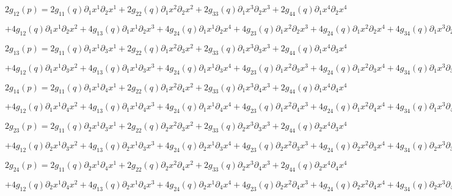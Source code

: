 		$2 g_{12}(p) = 2 g_{11}(q) \partial_1 x^1 \partial_2 x^1 + 2 g_{22}(q) \partial_1 x^2 \partial_2 x^2 + 2 g_{33}(q) \partial_1 x^3 \partial_2 x^3 + 2 g_{44}(q) \partial_1 x^4 \partial_2 x^4$

		$+ 4 g_{12}(q) \partial_1 x^1 \partial_2 x^2 + 4 g_{13}(q) \partial_1 x^1 \partial_2 x^3 + 4 g_{24}(q) \partial_1 x^1 \partial_2 x^4 + 4 g_{23}(q) \partial_1 x^2 \partial_2 x^3 + 4 g_{24}(q) \partial_1 x^2 \partial_2 x^4 + 4 g_{34}(q) \partial_1 x^3 \partial_2 x^4$

		$2 g_{13}(p) = 2 g_{11}(q) \partial_1 x^1 \partial_3 x^1 + 2 g_{22}(q) \partial_1 x^2 \partial_3 x^2 + 2 g_{33}(q) \partial_1 x^3 \partial_3 x^3 + 2 g_{44}(q) \partial_1 x^4 \partial_3 x^4$

		$+ 4 g_{12}(q) \partial_1 x^1 \partial_3 x^2 + 4 g_{13}(q) \partial_1 x^1 \partial_3 x^3 + 4 g_{24}(q) \partial_1 x^1 \partial_3 x^4 + 4 g_{23}(q) \partial_1 x^2 \partial_3 x^3 + 4 g_{24}(q) \partial_1 x^2 \partial_3 x^4 + 4 g_{34}(q) \partial_1 x^3 \partial_3 x^4$

		$2 g_{14}(p) = 2 g_{11}(q) \partial_1 x^1 \partial_4 x^1 + 2 g_{22}(q) \partial_1 x^2 \partial_4 x^2 + 2 g_{33}(q) \partial_1 x^3 \partial_4 x^3 + 2 g_{44}(q) \partial_1 x^4 \partial_4 x^4$

		$+ 4 g_{12}(q) \partial_1 x^1 \partial_4 x^2 + 4 g_{13}(q) \partial_1 x^1 \partial_4 x^3 + 4 g_{24}(q) \partial_1 x^1 \partial_4 x^4 + 4 g_{23}(q) \partial_1 x^2 \partial_4 x^3 + 4 g_{24}(q) \partial_1 x^2 \partial_4 x^4 + 4 g_{34}(q) \partial_1 x^3 \partial_4 x^4$

		$2 g_{23}(p) = 2 g_{11}(q) \partial_2 x^1 \partial_3 x^1 + 2 g_{22}(q) \partial_2 x^2 \partial_3 x^2 + 2 g_{33}(q) \partial_2 x^3 \partial_3 x^3 + 2 g_{44}(q) \partial_2 x^4 \partial_3 x^4$

		$+ 4 g_{12}(q) \partial_2 x^1 \partial_3 x^2 + 4 g_{13}(q) \partial_2 x^1 \partial_3 x^3 + 4 g_{24}(q) \partial_2 x^1 \partial_3 x^4 + 4 g_{23}(q) \partial_2 x^2 \partial_3 x^3 + 4 g_{24}(q) \partial_2 x^2 \partial_3 x^4 + 4 g_{34}(q) \partial_2 x^3 \partial_3 x^4$

		$2 g_{24}(p) = 2 g_{11}(q) \partial_2 x^1 \partial_4 x^1 + 2 g_{22}(q) \partial_2 x^2 \partial_4 x^2 + 2 g_{33}(q) \partial_2 x^3 \partial_4 x^3 + 2 g_{44}(q) \partial_2 x^4 \partial_4 x^4$

		$+ 4 g_{12}(q) \partial_2 x^1 \partial_4 x^2 + 4 g_{13}(q) \partial_2 x^1 \partial_4 x^3 + 4 g_{24}(q) \partial_2 x^1 \partial_4 x^4 + 4 g_{23}(q) \partial_2 x^2 \partial_4 x^3 + 4 g_{24}(q) \partial_2 x^2 \partial_4 x^4 + 4 g_{34}(q) \partial_2 x^3 \partial_4 x^4$


